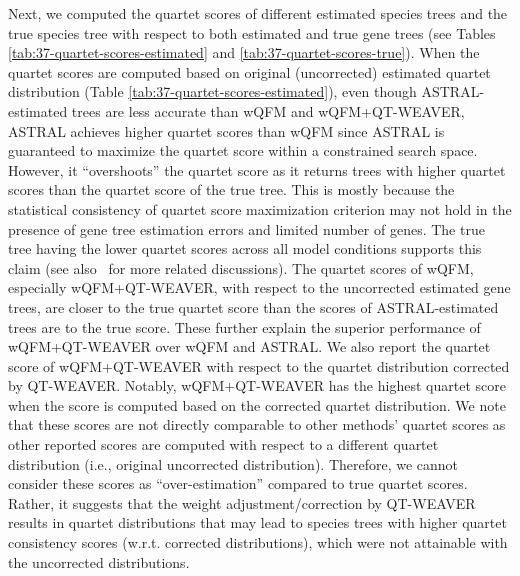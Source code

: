 \documentclass[runningheads]{llncs}
\begin{document}
Next, we computed the quartet scores of different estimated species trees and the true species tree with respect to both estimated and true gene trees (see Tables \ref{tab:37-quartet-scores-estimated} and \ref{tab:37-quartet-scores-true}). When the quartet scores are computed based on original (uncorrected) estimated quartet distribution (Table \ref{tab:37-quartet-scores-estimated}), even though ASTRAL-estimated trees are less accurate than wQFM and wQFM+QT-WEAVER, ASTRAL achieves higher quartet scores than wQFM since ASTRAL is guaranteed to maximize the quartet score within a constrained search space. However, it ``overshoots'' the quartet score as it returns trees with higher quartet scores than the quartet score of the true tree. %
This is mostly because the statistical consistency of quartet score maximization criterion may not hold in the presence of gene tree estimation errors and limited number of genes.
The true tree having the lower quartet scores across all model conditions supports this claim (see also~\cite{spterrace,farah2020phylogenomic,hasan2024leveraging} for more related discussions). %
The quartet scores of wQFM, especially wQFM+QT-WEAVER, with respect to the uncorrected estimated gene trees, are closer to the true quartet score than the scores of ASTRAL-estimated trees are to the true score. These further explain the superior performance of wQFM+QT-WEAVER over wQFM and ASTRAL. We also report the quartet score of wQFM+QT-WEAVER with respect to the quartet distribution corrected by QT-WEAVER. Notably, wQFM+QT-WEAVER has the highest quartet score when the score is computed based on the corrected quartet distribution. We note that these scores are not directly comparable to other methods' quartet scores as other reported scores are computed with respect to a different quartet distribution (i.e., original uncorrected distribution). Therefore, we cannot consider these scores as ``over-estimation'' compared to true quartet scores. Rather, it suggests that the weight adjustment/correction by QT-WEAVER results in quartet distributions that may lead to species trees with higher quartet consistency scores (w.r.t. corrected distributions), which were not attainable with the uncorrected distributions.
\end{document}
